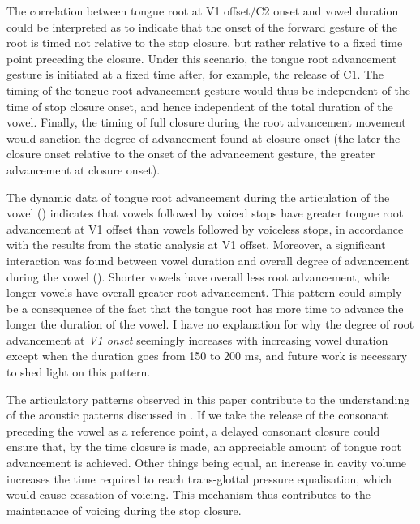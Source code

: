 \documentclass[preprint]{JASAnew}
\begin{document}
The correlation between tongue root at V1 offset/C2 onset and vowel
duration could be interpreted as to indicate that the onset of the
forward gesture of the root is timed not relative to the stop closure,
but rather relative to a fixed time point preceding the closure. Under
this scenario, the tongue root advancement gesture is initiated at a
fixed time after, for example, the release of C1. The timing of the
tongue root advancement gesture would thus be independent of the time of
stop closure onset, and hence independent of the total duration of the
vowel. Finally, the timing of full closure during the root advancement
movement would sanction the degree of advancement found at closure onset
(the later the closure onset relative to the onset of the advancement
gesture, the greater advancement at closure onset).

The dynamic data of tongue root advancement during the articulation of
the vowel () indicates that vowels followed by voiced
stops have greater tongue root advancement at V1 offset than vowels
followed by voiceless stops, in accordance with the results from the
static analysis at V1 offset. Moreover, a significant interaction was
found between vowel duration and overall degree of advancement during
the vowel (). Shorter vowels have overall less root
advancement, while longer vowels have overall greater root advancement.
This pattern could simply be a consequence of the fact that the tongue
root has more time to advance the longer the duration of the vowel. I
have no explanation for why the degree of root advancement at \emph{V1
onset} seemingly increases with increasing vowel duration except when
the duration goes from 150 to 200 ms, and future work is necessary to
shed light on this pattern.

The articulatory patterns observed in this paper contribute to the
understanding of the acoustic patterns discussed in . If
we take the release of the consonant preceding the vowel as a reference
point, a delayed consonant closure could ensure that, by the time
closure is made, an appreciable amount of tongue root advancement is
achieved. Other things being equal, an increase in cavity volume
increases the time required to reach trans-glottal pressure
equalisation, which would cause cessation of voicing. This mechanism
thus contributes to the maintenance of voicing during the stop closure.
\end{document}
